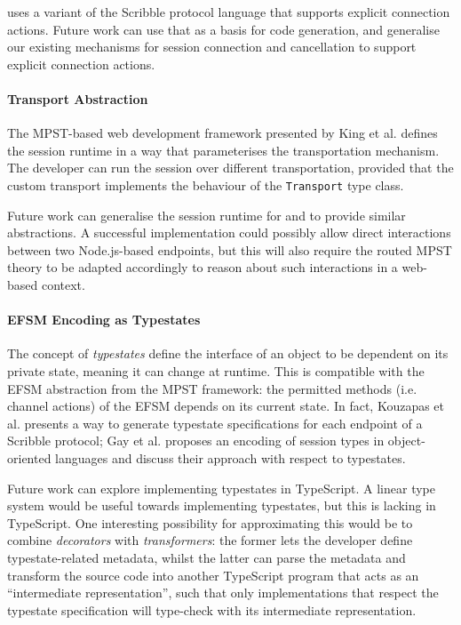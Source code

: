 \cite{ExplicitConnections} uses a variant of the Scribble protocol
language that supports explicit connection actions. Future work
can use that as a basis for code generation, and generalise
our existing mechanisms for session connection and cancellation
to support explicit connection actions.

\paragraph{Transport Abstraction}
The MPST-based web development framework presented by 
King et al. \cite{PureScript2019} defines the session runtime
in a way that parameterises the transportation mechanism.
The developer can run the session over different transportation,
provided that the custom transport implements the behaviour
of the \texttt{Transport} type class.

Future work can generalise the session runtime for 
 and  to provide
similar abstractions. A successful implementation could
possibly allow direct interactions between two Node.js-based
endpoints, but this will also require the routed MPST
theory to be adapted accordingly to reason about
such interactions in a web-based context.

\paragraph{EFSM Encoding as Typestates}
The concept of \textit{typestates} define the interface of
an object to be dependent on its private state, meaning
it can change at runtime.
This is compatible with the EFSM abstraction from the
MPST framework: the permitted methods (i.e. channel actions)
of the EFSM depends on its current state.
In fact, Kouzapas et al. \cite{StMungo} presents a way to
generate typestate specifications for each endpoint of a
Scribble protocol; Gay et al. \cite{ModularST} proposes
an encoding of session types in object-oriented languages
and discuss their approach with respect to typestates.

Future work can explore implementing typestates
in TypeScript. A linear type system would be useful towards 
implementing typestates, but this is lacking in TypeScript.
One interesting possibility for approximating this would
be to combine \textit{decorators} with \textit{transformers}:
the former lets the developer define typestate-related metadata,
whilst the latter can parse the metadata and
transform the source code into another TypeScript program that acts
as an ``intermediate representation'',
such that only implementations that respect the typestate specification
will type-check with its intermediate representation.